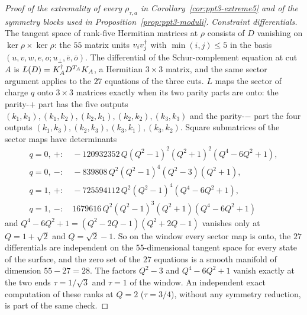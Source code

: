 \begin{proof}[Proof of the extremality of every $\rho_{\tau,a}$ in Corollary~\ref{cor:ppt3-extreme5} and of the symmetry blocks used in Proposition~\ref{prop:ppt3-moduli}]
\emph{Constraint differentials.} The tangent space of rank-five Hermitian matrices at $\rho$ consists of $D$ vanishing on
$\ker\rho\times\ker\rho$: the $55$ matrix units $v_iv_j^{\dagger}$ with $\min(i,j)\le5$ in the basis $(u,v,w,e,o;u_\perp,\bar e,\bar o)$. The differential of
the Schur-complement equation at cut $A$ is $L(D)=K_A^{\dagger} D^{T_A}K_A$, a Hermitian $3\times3$ matrix, and the same sector argument applies to the
$27$ equations of the three cuts. $L$ maps the sector of charge $q$ onto $3\times3$ matrices exactly when its two parity parts are onto:
the parity-$+$ part has the five outputs $(k_1,k_1),(k_1,k_2),(k_2,k_1),(k_2,k_2),(k_3,k_3)$ and the parity-$-$ part the four outputs
$(k_1,k_3),(k_2,k_3),(k_3,k_1),(k_3,k_2)$. Square submatrices of the sector maps have determinants
\begin{align*}
q=0,\ +:&\ -120932352\,Q(Q^2-1)^2(Q^2+1)^2(Q^4-6Q^2+1),\\
q=0,\ -:&\ -839808\,Q^2(Q^2-1)^4(Q^2-3)(Q^2+1),\\
q=1,\ +:&\ -725594112\,Q^2(Q^2-1)^4(Q^4-6Q^2+1),\\
q=1,\ -:&\ 1679616\,Q^2(Q^2-1)^3(Q^2+1)(Q^4-6Q^2+1)
\end{align*}
and $Q^4-6Q^2+1=(Q^2-2Q-1)(Q^2+2Q-1)$ vanishes only at $Q=1+\sqrt2$ and $Q=\sqrt2-1$. So on the window
every sector map is onto, the $27$ differentials are independent on the $55$-dimensional tangent space for every state of the surface, and the
zero set of the $27$ equations is a smooth manifold of dimension $55-27=28$. The factors $Q^2-3$ and $Q^4-6Q^2+1$ vanish exactly at the two
ends $\tau=1/\sqrt3$ and $\tau=1$ of the window. An independent exact computation of these ranks at $Q=2$ ($\tau=3/4$), without any symmetry reduction, is part of the same
check.
\end{proof}

